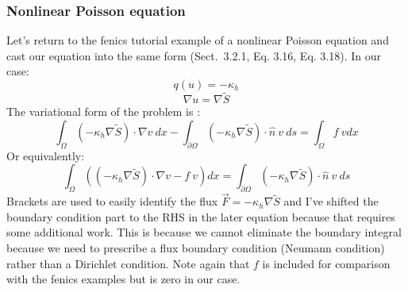 \subsubsection{Nonlinear Poisson equation}
Let's return to the fenics tutorial example of a nonlinear Poisson equation and cast our equation into the same form (Sect.~3.2.1, Eq. 3.16, Eq. 3.18).  In our case:
\begin{equation}
q(u) = -\kappa_h
\end{equation}
\begin{equation}
\nabla u = \nabla \tilde{S}
\end{equation}
The variational form of the problem is :
\begin{equation}
\int_\Omega \left(-\kappa_h \nabla \tilde{S} \right) \cdot \nabla v\ dx - \int_{\partial \Omega} \left(-\kappa_h \nabla \tilde{S}\right) \cdot \hat{n}\ v\ ds = \int_\Omega f\ v dx
\end{equation}
Or equivalently:
\begin{equation}
\int_\Omega \left( \left(-\kappa_h \nabla \tilde{S}\right) \cdot \nabla v - f\ v\right) dx = \int_{\partial \Omega} \left( -\kappa_h \nabla \tilde{S} \right) \cdot \hat{n}\ v\ ds
\end{equation}
Brackets are used to easily identify the flux $\vec{F}= -\kappa_h \nabla \tilde{S}$ and I've shifted the boundary condition part to the RHS in the later equation because that requires some additional work.  This is because we cannot eliminate the boundary integral because we need to prescribe a flux boundary condition (Neumann condition) rather than a Dirichlet condition.  Note again that $f$ is included for comparison with the fenics examples but is zero in our case.
